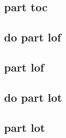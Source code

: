 		\subsection{part toc}
		

		\subsection{do part lof}

		\subsection{part lof}

		\subsection{do part lot}

		\subsection{part lot}





















